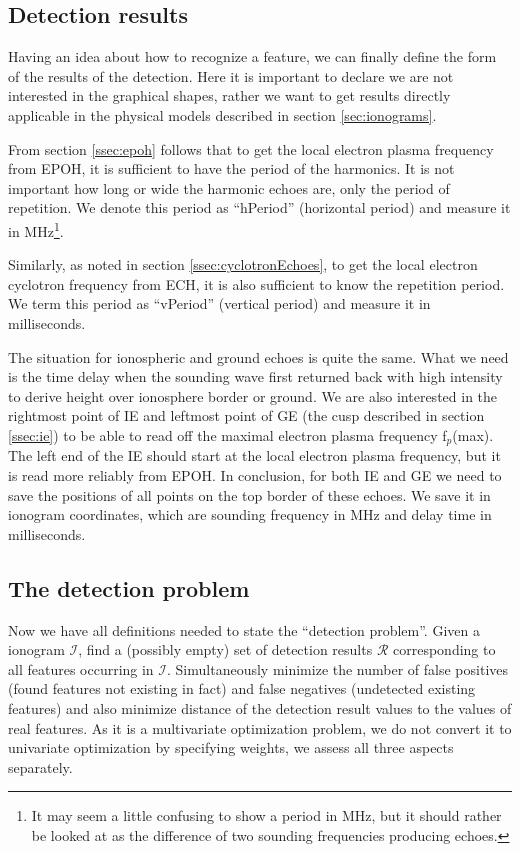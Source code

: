 \subsection{Detection results}
Having an idea about how to recognize a feature, we can finally define the form of the results of the detection. Here it is important to declare we are not interested in the graphical shapes, rather we want to get results directly applicable in the physical models described in section \ref{sec:ionograms}. 

From section \ref{ssec:epoh} follows that to get the local electron plasma frequency from EPOH, it is sufficient to have the period of the harmonics. It is not important how long or wide the harmonic echoes are, only the period of repetition. We  denote this period as ``hPeriod'' (horizontal period) and measure it in MHz\footnote{It may seem a little confusing to show a period in MHz, but it should rather be looked at as the difference of two sounding frequencies producing echoes.}.

Similarly, as noted in section \ref{ssec:cyclotronEchoes}, to get the local electron cyclotron frequency from ECH, it is also sufficient to know the repetition period. We term this period as ``vPeriod'' (vertical period) and measure it in milliseconds. 

The situation for ionospheric and ground echoes is quite the same. What we need is the time delay when the sounding wave first returned back with high intensity to derive height over ionosphere border or ground. We are also interested in the rightmost point of IE and leftmost point of GE (the cusp described in section \ref{ssec:ie}) to be able to read off the maximal electron plasma frequency f$_p$(max). The left end of the IE should start at the local electron plasma frequency, but it is read more reliably from EPOH. In conclusion, for both IE and GE we need to save the positions of all points on the top border of these echoes. We save it in ionogram coordinates, which are sounding frequency in MHz and delay time in milliseconds.

\subsection{The detection problem}
Now we have all definitions needed to state the ``detection problem''. Given a ionogram $\mathcal{I}$, find a (possibly empty) set of detection results $\mathcal{R}$ corresponding to all features occurring in $\mathcal{I}$. Simultaneously minimize the number of false positives (found features not existing in fact) and false negatives (undetected existing features) and also minimize distance of the detection result values to the values of real features. As it is a multivariate optimization problem, we do not convert it to univariate optimization by specifying weights, we assess all three aspects separately.

